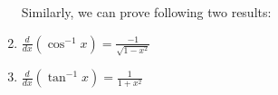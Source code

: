 \begin{enumerate}
        Similarly, we can prove following two results:
        
   
    \item $\frac{d}{dx} \left( \cos^{-1} x \right) = \frac{-1}{\sqrt{1 - x^2}}$
    
    \item $\frac{d}{dx} \left( \tan^{-1} x \right) = \frac{1}{1 + x^2}$


\end{enumerate}